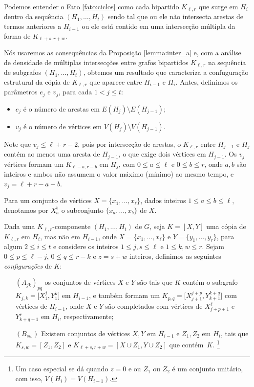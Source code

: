 \documentclass[12pt,a4paper]{book}
\newcommand{\K}{K_{\ell,r}} %
\begin{document}
Podemos entender o Fato \ref{fato:ciclos} como cada bipartido $\K$ que surge em $H_i$ dentro da sequência $(H_1, \ldots, H_t)$ sendo tal que ou ele não intersecta arestas de termos anteriores a $H_{i-1}$ ou ele está contido em uma intersecção múltipla da forma de $K_{\ell+s, r+w}$. 

      Nós usaremos as consequências da Proposição \ref{lemma:inter_a} e, com a análise de densidade de múltiplas intersecções entre grafos bipartidos $\K$ na sequência de subgrafos $(H_1, \ldots, H_t)$, obtemos um resultado que caracteriza a confuguração estrutural da cópia de $\K$ que aparece entre $H_{i-1}$ e $H_i$.
     Antes, definimos os parâmetros $e_j$ e $v_j$, para cada $1 < j \leq t$:
     \begin{itemize}
         \item $e_j$ é o número de arestas em $E(H_{j}) \setminus E(H_{j-1})$;
         \item $v_j$ é o número de vértices em $V(H_{j}) \setminus V(H_{j-1})$. 
     \end{itemize}
     
     Note que $v_j \leq \ell+r-2$, pois por intersecção de arestas, o $\K$ entre $H_{j-1}$ e $H_{j}$ contém ao menos uma aresta de $H_{j-1}$, o que exige dois vértices em $H_{j-1}$. 
     Os $v_{j}$ vértices formam um $K_{\ell-a,r-b}$ em $H_{j}$, com $0 \leq a\leq \ell$ e $0\leq b\leq r$, onde $a,b$ são inteiros e ambos não assumem o valor máximo (mínimo) ao mesmo tempo, e $v_{j} = \ell+r-a-b$.
 

  Para um conjunto de vértices $X = \{x_1, \ldots, x_\ell\}$, dados inteiros $1 \leq a \leq b \leq \ell$, denotamos por $X_a^b$ o subconjunto $\{x_a, \ldots, x_b\}$ de $X$. 

    Dada uma $\K$-componente $(H_1, \ldots, H_t)$ de $G$, 
    seja $K = [X, Y]$ uma cópia de $\K$ em $H_i$, mas não em $H_{i-1}$, 
    onde $X = \{x_1, \ldots, x_\ell\}$ e $Y=\{y_1, \ldots, y_r\}$, para algum $2\leq i\leq t$
    e considere os inteiros $1 \leq j, s \leq \ell$ e $1 \leq k,w \leq r$.  
    Sejam $0 \leq p \leq \ell-j$, $0\leq q \leq r -k$ e $z = s+w$ inteiros, 
     definimos as seguintes \emph{configurações} de $K$: 
       \begin{enumerate}
       \item[$(A_{jk})_{pq}$]\label{configA} 
        os conjuntos de vértices $X$ e $Y$ são tais que $K$
    contém o subgrafo
    $K_{j,k} = \big[X_1^j, Y_1^k\big]$ em $H_{i-1}$, 
    e também formam um 
    $K_{p,q} = \big[X_{j+1}^{j+p}, Y_{k+1}^{k+q}\big]$
    com  vértices de $H_{i-1}$, onde $X$ e $Y$ são completados com vértices de
    $X_{j+p+1}^\ell$ e $Y_{k+q+1}^r$ em $H_i$, respectivamente;
                
       \item[$(B_{sw})$]\label{configB} 
        Existem conjuntos de vértices $X,Y$ em $H_{i-1}$ e $Z_1, Z_2$ em $H_i$, tais que
      $K_{s,w} = [Z_1, Z_2]$ e 
      $K_{\ell+s,r+w}= [X\cup Z_1, Y\cup Z_2]$ que contém~$K$.
      \footnote[1]{Um caso especial se dá quando $z = 0$ e 
     ou $Z_1$ ou $Z_2$ é um conjunto unitário, com isso, $V(H_i) = V(H_{i-1})$.}
       \end{enumerate}
\end{document}
